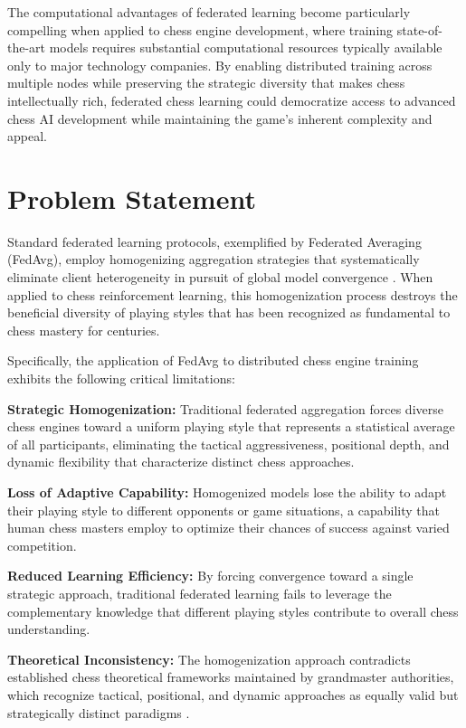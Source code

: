 The computational advantages of federated learning become particularly compelling when applied to chess engine development, where training state-of-the-art models requires substantial computational resources typically available only to major technology companies. By enabling distributed training across multiple nodes while preserving the strategic diversity that makes chess intellectually rich, federated chess learning could democratize access to advanced chess AI development while maintaining the game's inherent complexity and appeal.

\section{Problem Statement}
\label{sec:problem}

Standard federated learning protocols, exemplified by Federated Averaging (FedAvg), employ homogenizing aggregation strategies that systematically eliminate client heterogeneity in pursuit of global model convergence \cite{li2020federated}. When applied to chess reinforcement learning, this homogenization process destroys the beneficial diversity of playing styles that has been recognized as fundamental to chess mastery for centuries.

Specifically, the application of FedAvg to distributed chess engine training exhibits the following critical limitations:

\textbf{Strategic Homogenization:} Traditional federated aggregation forces diverse chess engines toward a uniform playing style that represents a statistical average of all participants, eliminating the tactical aggressiveness, positional depth, and dynamic flexibility that characterize distinct chess approaches.

\textbf{Loss of Adaptive Capability:} Homogenized models lose the ability to adapt their playing style to different opponents or game situations, a capability that human chess masters employ to optimize their chances of success against varied competition.

\textbf{Reduced Learning Efficiency:} By forcing convergence toward a single strategic approach, traditional federated learning fails to leverage the complementary knowledge that different playing styles contribute to overall chess understanding.

\textbf{Theoretical Inconsistency:} The homogenization approach contradicts established chess theoretical frameworks maintained by grandmaster authorities, which recognize tactical, positional, and dynamic approaches as equally valid but strategically distinct paradigms \cite{matanovic1974encyclopedia,chess_opening_styles}.

